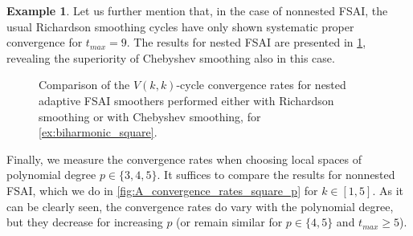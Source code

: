 \documentclass[a4paper]{article}
\theoremstyle{plain}
\theoremstyle{definition}
\newtheorem{example}{Example}[section]
\theoremstyle{remark}
\begin{document}
\begin{example}
	Let us further mention that, in the case of nonnested FSAI, the usual Richardson smoothing cycles have only shown systematic proper convergence for \(t_{max} = 9\). The results for nested FSAI are presented in \cref{fig:chebyshev_vs_richardson}, revealing the superiority of Chebyshev smoothing also in this case.

	\begin{figure}[tbhp]
		\centering
		\caption{Comparison of the \(V(k,k)\)-cycle convergence rates for nested adaptive FSAI smoothers performed either with Richardson smoothing or with Chebyshev smoothing, for \cref{ex:biharmonic_square}.}
		\label{fig:chebyshev_vs_richardson}
	\end{figure}
	
	Finally, we measure the convergence rates when choosing local spaces of polynomial degree \(p \in \{3, 4, 5\}\). It suffices to compare the results for nonnested FSAI, which we do in \cref{fig:A_convergence_rates_square_p} for \(k \in [1,5]\). As it can be clearly seen, the convergence rates do vary with the polynomial degree, but they decrease for increasing \(p\) (or remain similar for \(p\in\{4,5\}\) and \(t_{max} \geq 5\)).


\end{example}
\end{document}
